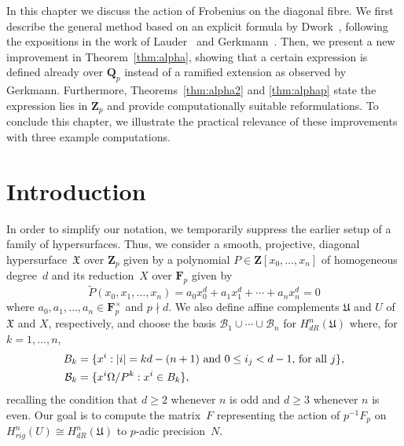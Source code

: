 
In this chapter we discuss the action of Frobenius on the diagonal fibre. 
We first describe the general method based on an explicit formula by 
Dwork~\citep[\S 4]{Dwork64}, following the expositions in the work of 
Lauder~\citep[\S 6]{Lau04} and Gerkmann~\citep[\S 4.4]{Gerkmann2007}.  Then, 
we present a new improvement in Theorem~\ref{thm:alpha}, showing that a 
certain expression is defined already over $\mathbf{Q}_p$ instead of a ramified
extension as observed by Gerkmann.  Furthermore, Theorems~\ref{thm:alpha2} 
and \ref{thm:alphap} state the expression lies in $\mathbf{Z}_p$ and 
provide computationally suitable reformulations.  To conclude this chapter, 
we illustrate the practical relevance of these improvements with three example 
computations.


\section{Introduction}

In order to simplify our notation, we temporarily suppress the earlier 
setup of a family of hypersurfaces.
Thus, we consider a smooth, projective, diagonal hypersurface~$\mathfrak{X}$ 
over $\mathbf{Z}_p$ given by a polynomial $P \in \mathbf{Z}[x_0, \dotsc, x_n]$ 
of homogeneous degree~$d$ and its reduction~$X$ over $\mathbf{F}_p$ given by 
\begin{equation*}
\tilde{P}(x_0, x_1, \dotsc, x_n) = 
    a_0 x_0^d + a_1 x_1^d + \dotsb + a_n x_n^d = 0
\end{equation*}
where $a_0, a_1, \dotsc, a_n \in \mathbf{F}_p^{\times}$ and $p \nmid d$.  
We also define affine complements $\mathfrak{U}$ and $U$ of $\mathfrak{X}$ 
and $X$, respectively, and choose the basis 
$\mathcal{B}_1 \cup \dotsb \cup \mathcal{B}_n$ for $H_{dR}^n(\mathfrak{U})$ 
where, for $k = 1, \dotsc, n$, 
\begin{align*}
B_k & = \{ x^i : \text{$\lvert i\rvert = kd - (n+1)$ and $0 \leq i_j < d-1$, for all $j$} \}, \\
\mathcal{B}_k & = \{x^i \Omega / P^k : x^i \in B_k \}, 
\end{align*}
recalling the condition that $d \geq 2$ whenever $n$ is odd and $d \geq 3$ 
whenever $n$ is even.  Our goal is to compute the matrix~$F$ representing 
the action of $p^{-1} F_p$ on $H_{rig}^n(U) \cong H_{dR}^n(\mathfrak{U})$ 
to $p$-adic precision~$N$.


